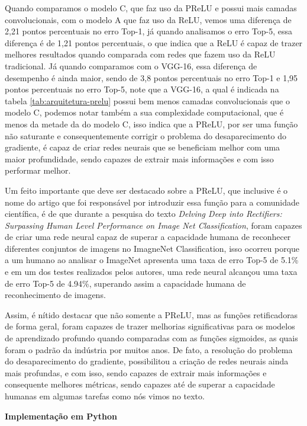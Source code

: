 Quando comparamos o modelo C, que faz uso da PReLU e possui mais camadas convolucionais, com o modelo A que faz uso da ReLU, vemos uma diferença de 2,21 pontos percentuais no erro Top-1, já quando analisamos o erro Top-5, essa diferença é de 1,21 pontos percentuais, o que indica que a ReLU é capaz de trazer melhores resultados quando comparada com redes que fazem uso da ReLU tradicional. Já quando comparamos com o VGG-16, essa diferença de desempenho é ainda maior, sendo de 3,8 pontos percentuais no erro Top-1 e 1,95 pontos percentuais no erro Top-5, note que a VGG-16, a qual é indicada na tabela \ref{tab:arquitetura-prelu} possui bem menos camadas convolucionais que o modelo C, podemos notar também a sua complexidade computacional, que é menos da metade da do modelo C, isso indica que a PReLU, por ser uma função não saturante e consequentemente corrigir o problema do desaparecimento do gradiente, é capaz de criar redes neurais que se beneficiam melhor com uma maior profundidade, sendo capazes de extrair mais informações e com isso performar melhor.

Um feito importante que deve ser destacado sobre a PReLU, que inclusive é o nome do artigo que foi responsável por introduzir essa função para a comunidade científica, é de que durante a pesquisa do texto \textit{Delving Deep into Rectifiers: Surpassing Human Level Performance on Image Net Classification}, \textcite{PReLUArticle} foram capazes de criar uma rede neural capaz de superar a capacidade humana de reconhecer diferentes conjuntos de imagens no ImagneNet Classification, isso ocorreu porque a um humano ao analisar o ImageNet apresenta uma taxa de erro Top-5 de 5.1\% e em um dos testes realizados pelos autores, uma rede neural alcançou uma taxa de erro Top-5 de 4.94\%, superando assim a capacidade humana de reconhecimento de imagens. 

Assim, é nítido destacar que não somente a PReLU, mas as funções retificadoras de forma geral, foram capazes de trazer melhorias significativas para os modelos de aprendizado profundo quando comparadas com as funções sigmoides, as quais foram o padrão da indústria por muitos anos. De fato, a resolução do problema do desaparecimento do gradiente, possibilitou a criação de redes neurais ainda mais profundas, e com isso, sendo capazes de extrair mais informações e consequente melhores métricas, sendo capazes até de superar a capacidade humanas em algumas tarefas como nós vimos no texto.

\textbf{Implementação em Python}

